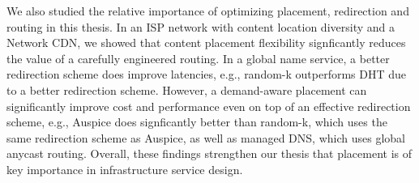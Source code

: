 We also studied the relative importance of optimizing placement, redirection and routing in this thesis. In an ISP network with content location diversity and a Network CDN, we showed that content placement flexibility signficantly reduces the value of a carefully engineered routing. In a global name service, a better redirection scheme does improve latencies, e.g., random-k outperforms DHT due to a better redirection scheme. However, a demand-aware placement can significantly improve cost and performance even on top of an effective redirection scheme, e.g.,  Auspice does signficantly better than random-k, which uses the same redirection scheme as Auspice, as well as managed DNS, which uses global anycast routing. Overall, these findings strengthen our thesis that placement is of key importance in infrastructure service design.
